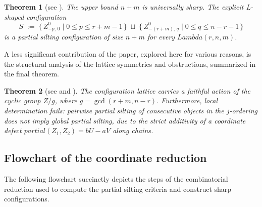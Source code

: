 \documentclass[11pt, a4paper]{article}
\newtheorem{theorem}{Theorem}[section]
\theoremstyle{definition}
\def\Lambda{Lambda}%
\def\partial{partial}%
\def\mathbb#1{#1}%
\def\mathcal#1{#1}%
\begin{document}
\begin{theorem}[see ]\label{thm:intro-sharp}
The upper bound $n+m$ is universally sharp. The explicit L-shaped configuration
\[
  S \;:=\; \bigl\{\, Z_{-p,\,0}^0 \;\big|\; 0 \le p \le r+m-1 \,\bigr\}
  \;\sqcup\;
  \bigl\{\, Z_{-(r+m),\,q}^0 \;\big|\; 0 \le q \le n-r-1 \,\bigr\}
\]
is a partial silting configuration of size $n+m$ for every $\Lambda(r,n,m)$.
\end{theorem}

A less significant contribution of the paper, explored here for various reasons, is the structural analysis of the lattice symmetries and obstructions, summarized in the final theorem.

\begin{theorem}[see  and ]\label{thm:intro-structure}
The configuration lattice carries a faithful action of the cyclic group $\mathbb Z/g$, where $g = \gcd(r+m, n-r)$. Furthermore, local determination fails: pairwise partial silting of consecutive objects in the $j$-ordering does not imply global partial silting, due to the strict additivity of a coordinate defect $\partial(Z_1, Z_2) = bU - aV$ along chains.
\end{theorem}

\subsection{Flowchart of the coordinate reduction}
\label{subsec:intro-flowchart}

The following flowchart succinctly depicts the steps of the combinatorial reduction used to compute the partial silting criteria and construct sharp configurations.

\begin{center}
\end{center}
\end{document}
